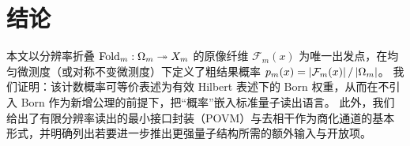 \section{结论}

本文以分辨率折叠 $\mathrm{Fold}_m:\Omega_m\twoheadrightarrow X_m$ 的原像纤维 $\mathcal F_m(x)$ 为唯一出发点，在均匀微测度（或对称不变微测度）下定义了粗结果概率 $p_m(x)=\left\lvert \mathcal F_m(x)\right\rvert/\left\lvert \Omega_m\right\rvert$。
我们证明：该计数概率可等价表述为有效 Hilbert 表述下的 Born 权重，从而在不引入 Born 作为新增公理的前提下，把“概率”嵌入标准量子读出语言。
此外，我们给出了有限分辨率读出的最小接口封装（POVM）与去相干作为商化通道的基本形式，并明确列出若要进一步推出更强量子结构所需的额外输入与开放项。

